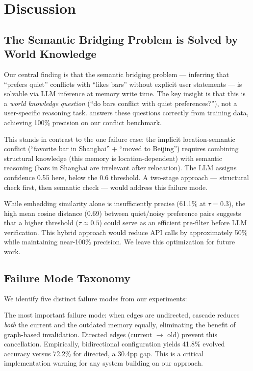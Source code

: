 \section{Discussion}
\label{sec:discussion}

\subsection{The Semantic Bridging Problem is Solved by World Knowledge}
\label{sec:discussion:semantic}

Our central finding is that the semantic bridging problem --- inferring that ``prefers quiet'' conflicts with ``likes bars'' without explicit user statements --- is solvable via LLM inference at memory write time. The key insight is that this is a \textit{world knowledge question} (``do bars conflict with quiet preferences?''), not a user-specific reasoning task. \gptfouromini answers these questions correctly from training data, achieving 100\% precision on our conflict benchmark.

This stands in contrast to the one failure case: the implicit location-semantic conflict (``favorite bar in Shanghai'' + ``moved to Beijing'') requires combining structural knowledge (this memory is location-dependent) with semantic reasoning (bars in Shanghai are irrelevant after relocation). The LLM assigns confidence 0.55 here, below the 0.6 threshold. A two-stage approach --- structural \locatedin check first, then semantic \conflictswith check --- would address this failure mode.

While embedding similarity alone is insufficiently precise (61.1\% at $\tau = 0.3$), the high mean cosine distance (0.69) between quiet/noisy preference pairs suggests that a higher threshold ($\tau \approx 0.5$) could serve as an efficient pre-filter before LLM verification. This hybrid approach would reduce API calls by approximately 50\% while maintaining near-100\% precision. We leave this optimization for future work.

\subsection{Failure Mode Taxonomy}
\label{sec:discussion:failures}

We identify five distinct failure modes from our experiments:

The most important failure mode: when \conflictswith edges are undirected, cascade reduces \textit{both} the current and the outdated memory equally, eliminating the benefit of graph-based invalidation. Directed edges (current $\rightarrow$ old) prevent this cancellation. Empirically, bidirectional configuration yields 41.8\% evolved accuracy versus 72.2\% for directed, a 30.4pp gap. This is a critical implementation warning for any system building on our approach.


